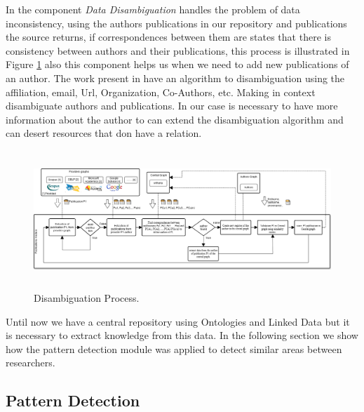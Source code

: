 \documentclass[11pt]{article}
\begin{document}
In the component \emph{Data Disambiguation} handles the problem of data inconsistency, using the authors publications in our repository and publications the source returns, if correspondences between them are states that there is consistency between authors and their publications, this process is illustrated in Figure \ref{fig:DisambiguationProcess} also this component helps us when we need to add new publications of an author. The work present in \cite{varadharajalu2011author} have an algorithm to disambiguation using the affiliation, email, Url, Organization, Co-Authors, etc. Making in context disambiguate authors and publications. In our case  is necessary to have more information about the author to can extend the disambiguation algorithm and can desert resources that don have a relation.


\begin{figure}[ht!]
	\centering
		\includegraphics[height=5.2cm]{desambiguationProcess.png}
	\caption{Disambiguation Process.}
	\label{fig:DisambiguationProcess}
\end{figure}

Until now we have a central repository using Ontologies and Linked Data but it is necessary to extract knowledge from this data. In the following section we show how the pattern detection module was applied to detect similar areas between researchers. 

  
\subsection{Pattern Detection}
\label{label:detectsimilarareas}
\end{document}
